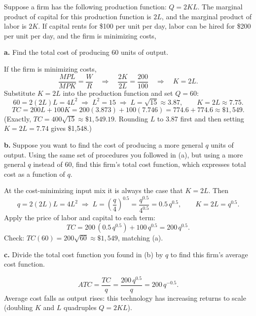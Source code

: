 \documentclass[11pt,a4paper]{article}
\newif\ifsolutions
\newcommand{\ans}[1]{\ifsolutions\else\par\vspace{0pt plus #1fill}\fi}
\newcommand{\MPL}{\mathit{MPL}}
\newcommand{\MPK}{\mathit{MPK}}
\begin{document}
\begin{enumerate}
Suppose a firm has the following production function: $Q = 2KL$. The marginal product of capital for this production function is $2L$, and the marginal product of labor is $2K$. If capital rents for \$100 per unit per day, labor can be hired for \$200 per unit per day, and the firm is minimizing costs,

\noindent\textbf{a.} Find the total cost of producing 60 units of output.
\ans{2.2}

\begin{solution}
If the firm is minimizing costs,
\[
\frac{\MPL}{\MPK} = \frac{W}{R}
\quad\Longrightarrow\quad
\frac{2K}{2L} = \frac{200}{100}
\quad\Longrightarrow\quad
K = 2L.
\]
Substitute $K = 2L$ into the production function and set $Q = 60$:
\[
60 = 2(2L)L = 4L^2 \;\Longrightarrow\; L^2 = 15 \;\Longrightarrow\; L = \sqrt{15} \approx 3.87,
\qquad K = 2L \approx 7.75.
\]
\[
TC = 200L + 100K = 200(3.873) + 100(7.746) = 774.6 + 774.6 \approx \$1{,}549.
\]
(Exactly, $TC = 400\sqrt{15} \approx \$1{,}549.19$. Rounding $L$ to 3.87 first and then setting $K = 2L = 7.74$ gives \$1,548.)
\end{solution}

\noindent\textbf{b.} Suppose you want to find the cost of producing a more general $q$ units of output. Using the same set of procedures you followed in (a), but using a more general $q$ instead of 60, find this firm's total cost function, which expresses total cost as a function of $q$.
\ans{2.2}

\begin{solution}
At the cost-minimizing input mix it is always the case that $K = 2L$. Then
\[
q = 2(2L)L = 4L^2
\;\Longrightarrow\;
L = \left(\frac{q}{4}\right)^{0.5} = \frac{q^{0.5}}{4^{0.5}} = 0.5\,q^{0.5},
\qquad
K = 2L = q^{0.5}.
\]
Apply the price of labor and capital to each term:
\[
TC = 200\,(0.5\,q^{0.5}) + 100\,q^{0.5} = 200\,q^{0.5}.
\]
Check: $TC(60) = 200\sqrt{60} \approx \$1{,}549$, matching (a).
\end{solution}

\noindent\textbf{c.} Divide the total cost function you found in (b) by $q$ to find this firm's average cost function.
\ans{1}

\begin{solution}
\[
ATC = \frac{TC}{q} = \frac{200\,q^{0.5}}{q} = 200\,q^{-0.5}.
\]
Average cost falls as output rises: this technology has increasing returns to scale (doubling $K$ and $L$ quadruples $Q = 2KL$).
\end{solution}


\end{enumerate}
\end{document}
